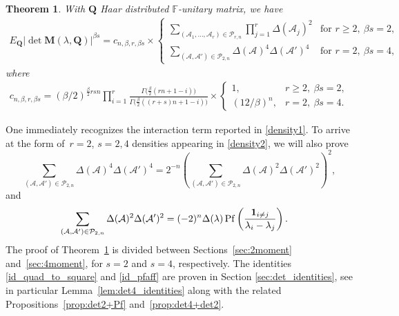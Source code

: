 \documentclass[pdftex]{sigma}
\numberwithin{equation}{section}
\newtheorem{Theorem}{Theorem}[section]
\theoremstyle{definition}
\newcommand{\FF}{{\mathbb{F}}}
\newcommand{\cP}{{\mathcal P}}
\newcommand{\ind}{{\bf{1}}}
\newcommand{\Pf}{\operatorname{Pf}}
\newcommand{\cA}{\mathcal{A}}
\newcommand{\mbf}[1]{\mathbf{#1}}
\begin{document}
\begin{Theorem}\label{thm:moment}
With $\boldsymbol{Q}$ Haar distributed $\FF$-unitary matrix, we have
\begin{align*}
 E_{\mbf{Q}} | \det \mbf{M}({\lambda}, \mbf{Q}) |^{\beta s} = c_{n, \beta, r,\beta s} \times
 \begin{cases}
 \sum\limits_{(\cA_1,\dots, \cA_r)\in \cP_{r,n}} \prod_{j=1}^r \Delta(\cA_j)^2 & \mbox{for } r \ge2, \ \beta s=2,\\[10pt]
 \sum\limits_{(\cA,\cA')\in \cP_{2,n}} \Delta(\cA)^4 \Delta(\cA')^4 & \mbox{for } r=2, \ \beta s = 4,
 \end{cases}
\end{align*}
where
\begin{align*}
 c_{n,\beta, r, \beta s} =(\beta/2) ^{\frac{\beta}{2}rsn} \prod_{i=1}^{r}
\frac{\Gamma \bigl(\frac{\beta }{2}(rn+1-i)\bigr)}{ \Gamma \bigl(\frac{\beta}{2}((r+s)n+1-i) \bigr)} \times \begin{cases}
 1, &r\ge2,\ \beta s=2,\\
 (12/\beta)^n, &r=2,\ \beta s=4.
\end{cases}
\end{align*}

\end{Theorem}
One immediately recognizes the interaction term reported in \eqref{density1}. To arrive at the form of~${r=2}$, $s=2,4$ densities appearing in \eqref{density2}, we will also prove
\begin{equation}
\label{id_quad_to_square}
 \sum_{ (\cA,\cA')\in \cP_{2,n}
 } \Delta (\cA)^4 \Delta (\cA')^4
 = 2^{-n} \left(\sum_{ (\cA,\cA')\in \cP_{2,n}
 }
 \Delta (\cA)^2 \Delta (\cA')^2\right)^2,
\end{equation}
and
 \begin{align}
 \label{id_pfaff}
 \sum_{
 (\cA,\cA')\in \cP_{2,n}
 } \Delta(\cA)^2 \Delta (\cA')^2&=(-2)^n \Delta (\lambda) \Pf\left(\frac{\ind_{i\neq j}}{\lambda_i-\lambda_j}\right).
 \end{align}
The proof of Theorem~\ref{thm:moment} is divided between Sections~\ref{sec:2moment} and~\ref{sec:4moment}, for $s=2$ and $s=4$, respectively. The identities \eqref{id_quad_to_square} and \eqref{id_pfaff} are proven in Section \ref{sec:det_identities}, see in particular Lemma~\ref{lem:det4_identities} along with the related
Propositions~\ref{prop:det2+Pf} and~\ref{prop:det4+det2}.
\end{document}
